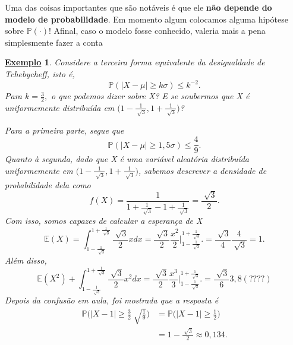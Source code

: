 \documentclass{article}
\newtheorem{example}{\underline{Exemplo}}
\begin{document}
Uma das coisas importantes que são notáveis é que ele \textbf{não depende do modelo de probabilidade}. Em momento algum colocamos
alguma hipótese sobre \(\mathbb{P}(\cdot )\)! Afinal, caso o modelo fosse conhecido, valeria mais a pena simplesmente fazer a conta
\begin{example}
  Considere a terceira forma equivalente da desigualdade de Tchebycheff, isto é, 
  \[
    \mathbb{P}(|X-\mu|\geq k\sigma )\leq k^{-2}.
  \]
  Para \(k=\frac{3}{2},\) o que podemos dizer sobre X? E se soubermos que X é uniformemente
  distribuída em \(\biggl(1-\frac{1}{\sqrt[]{3}}, 1 + \frac{1}{\sqrt[]{3}}\biggr)\)?

  Para a primeira parte, segue que 
  \[
    \mathbb{P}(|X-\mu|\geq 1,5\sigma )\leq \frac{4}{9}.
  \] 
  Quanto à segunda, dado que X é uma variável aleatória distribuída uniformemente em \(\biggl(1-\frac{1}{\sqrt[]{3}}, 1 + \frac{1}{\sqrt[]{3}}\biggr)\),
  sabemos descrever a densidade de probabilidade dela como 
  \[
    f(X) = \frac{1}{1+\frac{1}{\sqrt[]{3}} - 1 + \frac{1}{\sqrt[]{3}}} = \frac{\sqrt[]{3}}{2}.
  \]
  Com isso, somos capazes de calcular a esperança de X 
  \[
    \mathbb{E}(X) = \int_{1-\frac{1}{\sqrt[]{3}}}^{1 + \frac{1}{\sqrt[]{3}}} \frac{\sqrt[]{3}}{2}xdx = \frac{\sqrt[]{3}}{2}\frac{x^{2}}{2}\biggl|_{1-\frac{1}{\sqrt[]{3}}}^{1+\frac{1}{\sqrt[]{3}}}\biggr. = \frac{\sqrt[]{3}}{4} \frac{4}{\sqrt[]{3}} = 1.
  \]
  Além disso, 
  \[
    \mathbb{E}(X^{2}) + \int_{1-\frac{1}{\sqrt[]{3}}}^{1 + \frac{1}{\sqrt[]{3}}} \frac{\sqrt[]{3}}{2}x^{2}dx = \frac{\sqrt[]{3}}{2}\frac{x^{3}}{3}\biggl|_{1-\frac{1}{\sqrt[]{3}}}^{1+\frac{1}{\sqrt[]{3}}}\biggr. = \frac{\sqrt[]{3}}{6}3,8 (????)
  \]
  Depois da confusão em aula, foi mostrada que a resposta é
  \begin{align*}
    \mathbb{P}\biggl(|X-1|\geq \frac{3}{2}\sqrt[]{\frac{1}{9}}\biggr) &= \mathbb{P}\biggl(|X-1|\geq \frac{1}{2}\biggr) \\
                                                                      &= 1 - \frac{\sqrt[]{3}}{2} \approx 0,134.
  \end{align*}

\end{example}
\end{document}
